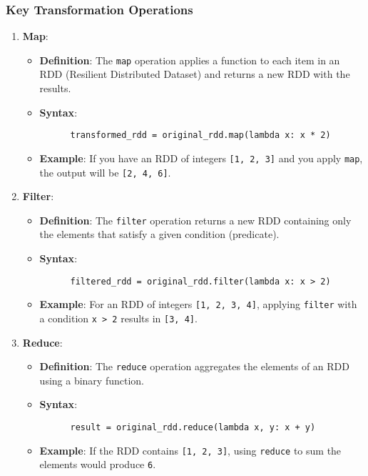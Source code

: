 \documentclass[aspectratio=169]{beamer}
\begin{document}
\begin{frame}[fragile]
  \frametitle{Key Transformation Operations}

  \begin{enumerate}
    \item \textbf{Map}:
    \begin{itemize}
      \item \textbf{Definition}: The \texttt{map} operation applies a function to each item in an RDD (Resilient Distributed Dataset) and returns a new RDD with the results.
      \item \textbf{Syntax}: 
      \begin{lstlisting}
      transformed_rdd = original_rdd.map(lambda x: x * 2)
      \end{lstlisting}
      \item \textbf{Example}: 
      If you have an RDD of integers \texttt{[1, 2, 3]} and you apply \texttt{map}, the output will be \texttt{[2, 4, 6]}.
    \end{itemize}

    \item \textbf{Filter}:
    \begin{itemize}
      \item \textbf{Definition}: The \texttt{filter} operation returns a new RDD containing only the elements that satisfy a given condition (predicate).
      \item \textbf{Syntax}: 
      \begin{lstlisting}
      filtered_rdd = original_rdd.filter(lambda x: x > 2)
      \end{lstlisting}
      \item \textbf{Example}: 
      For an RDD of integers \texttt{[1, 2, 3, 4]}, applying \texttt{filter} with a condition \texttt{x > 2} results in \texttt{[3, 4]}.
    \end{itemize}

    \item \textbf{Reduce}:
    \begin{itemize}
      \item \textbf{Definition}: The \texttt{reduce} operation aggregates the elements of an RDD using a binary function.
      \item \textbf{Syntax}: 
      \begin{lstlisting}
      result = original_rdd.reduce(lambda x, y: x + y)
      \end{lstlisting}
      \item \textbf{Example}: 
      If the RDD contains \texttt{[1, 2, 3]}, using \texttt{reduce} to sum the elements would produce \texttt{6}.
    \end{itemize}
  \end{enumerate}
\end{frame}
\end{document}
